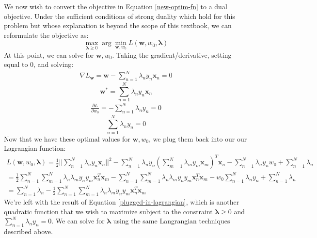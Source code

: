 
We now wish to convert the objective in Equation \ref{new-optim-fn} to a dual objective. Under the sufficient conditions of strong duality which hold for this problem but whose explanation is beyond the scope of this textbook, we can reformulate the objective as:
\begin{equation} \label{dual-objective}
	\max_{\boldsymbol{\lambda} \geq 0} \arg\min_{\textbf{w}, w_{0}} L(\textbf{w}, w_{0}, \boldsymbol{\lambda})
\end{equation}
At this point, we can solve for $\textbf{w}, w_{0}$. Taking the gradient/derivative, setting equal to 0, and solving:
\begin{align*}
	\nabla L_{\textbf{w}} = \textbf{w} - \sum_{n=1}^{N} \lambda_{n} y_{n} \textbf{x}_{n} = 0
\end{align*}
\begin{equation} \label{solve-for-w}
	\textbf{w}^{*} = \sum_{n=1}^{N} \lambda_{n} y_{n} \textbf{x}_{n}
\end{equation}
\begin{align*}
	\frac{\partial L}{\partial w_{0}} = - \sum_{n=1}^{N} \lambda_{n} y_{n} = 0
\end{align*}
\begin{equation} \label{solve-for-w0}
	\sum_{n=1}^{N} \lambda_{n} y_{n} = 0
\end{equation}
Now that we have these optimal values for $\textbf{w}, w_{0}$, we plug them back into our our Lagrangian function:
\begin{equation} \label{plugged-in-lagrangian}
	\begin{aligned}
		L(\textbf{w}, w_{0}, \boldsymbol{\lambda}) = \frac{1}{2} || \sum_{n=1}^{N} \lambda_{n} y_{n} \textbf{x}_{n} ||^{2} - \sum_{n=1}^{N} \lambda_{n} y_{n} (\sum_{m=1}^{N} \lambda_{m} y_{m} \textbf{x}_{m})^{T} \textbf{x}_{n} - \sum_{n=1}^{N} \lambda_{n} y_{n} w_{0} + \sum_{n=1}^{N} \lambda_{n} \\
		= \frac{1}{2} \sum_{n=1}^{N} \sum_{m=1}^{N} \lambda_{n} \lambda_{m} y_{n} y_{m} \textbf{x}_{n}^{T} \textbf{x}_{m} - \sum_{n=1}^{N} \sum_{m=1}^{N} \lambda_{n} \lambda_{m} y_{n} y_{m} \textbf{x}_{n}^{T} \textbf{x}_{m} - w_{0} \sum_{n=1}^{N} \lambda_{n} y_{n} + \sum_{n=1}^{N} \lambda_{n} \\
		= \sum_{n=1}^{N} \lambda_{n} - \frac{1}{2} \sum_{n=1}^{N} \sum_{m=1}^{N} \lambda_{n} \lambda_{m} y_{n} y_{m} \textbf{x}_{n}^{T} \textbf{x}_{m}
	\end{aligned}
\end{equation}
We're left with the result of Equation \ref{plugged-in-lagrangian}, which is another quadratic function that we wish to maximize subject to the constraint $\boldsymbol{\lambda} \geq 0$ and $\sum_{n=1}^{N} \lambda_{n} y_{n} = 0$. We can solve for $\boldsymbol{\lambda}$ using the same Langrangian techniques described above.

